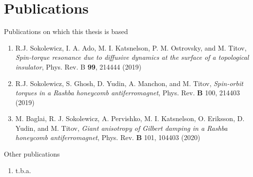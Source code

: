 \manualmark
{}%
%
%
\chapter*{Publications}%
Publications on which this thesis is based
\begin{enumerate}
    \item R.J. Sokolewicz, I. A. Ado, M. I. Katsnelson, P. M. Ostrovsky, and M. Titov, \textit{Spin-torque resonance due to diffusive dynamics at the surface of a topological insulator}, Phys. Rev. B \textbf{99}, 214444 (2019)
    \item R.J. Sokolewicz, S. Ghosh, D. Yudin, A. Manchon, and M. Titov, \textit{Spin-orbit torques in a Rashba honeycomb antiferromagnet}, Phys. Rev. \textbf{B} 100, 214403 (2019)
    \item M. Baglai, R. J. Sokolewicz, A. Pervishko, M. I. Katsnelson, O. Eriksson, D. Yudin, and M. Titov, \textit{Giant anisotropy of Gilbert damping in a Rashba honeycomb antiferromagnet}, Phys. Rev. \textbf{B} 101, 104403 (2020)
\end{enumerate}
Other publications
\begin{enumerate}
    \item t.b.a.
\end{enumerate}